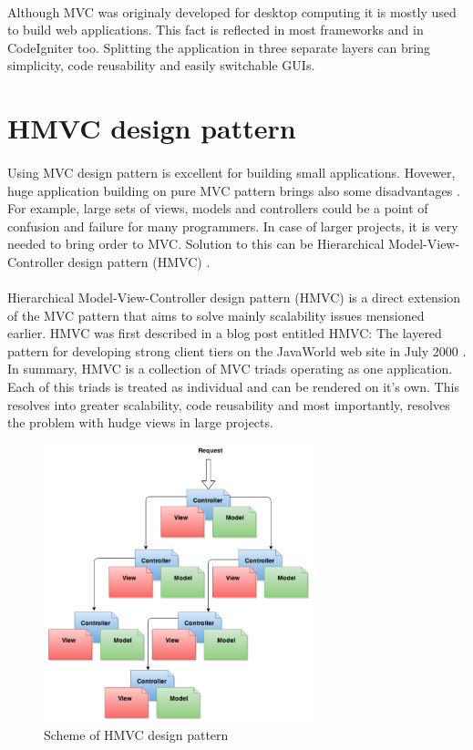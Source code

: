 \paragraph{}
Although MVC was originaly developed for desktop computing \cite{mvc} it is mostly used to build web applications. This fact is reflected in most frameworks and in CodeIgniter too. Splitting the application in three separate layers can bring simplicity, code reusability and easily switchable GUIs.

\section{HMVC design pattern}
\paragraph{}
Using MVC design pattern is excellent for building small applications. Hovewer, huge application building on pure MVC pattern brings also some disadvantages \cite{culik}. For example, large sets of views, models and controllers could be a point of confusion and failure for many programmers. In case of larger projects, it is very needed to bring order to MVC. Solution to this can be Hierarchical Model-View-Controller design pattern (HMVC) \cite{hmvc}.

\paragraph{}
Hierarchical Model-View-Controller design pattern (HMVC) is a direct extension of the MVC pattern that aims to solve mainly scalability issues mensioned earlier. HMVC was first described in a blog post entitled HMVC: The layered pattern for developing strong client tiers on the JavaWorld web site in July 2000 \cite{hmvc}. In summary, HMVC is a collection of MVC triads operating as one application. Each of this triads is treated as individual and can be rendered on it's own. This resolves into greater scalability, code reusability and most importantly, resolves the problem with hudge views in large projects.

\begin{figure}[h]
    \centering
    \includegraphics[width=0.7\textwidth]{courses/hmvc.png}
    \caption{Scheme of HMVC design pattern}
    \label{fig:awesome_image}
\end{figure}


